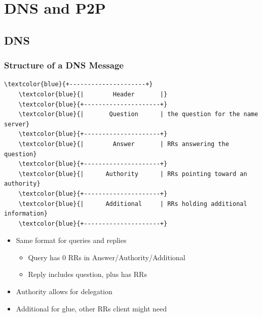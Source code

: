 \chapter{DNS and P2P}
\section{DNS}
\subsection{Structure of a DNS Message}
\begin{Verbatim}[commandchars=\\\{\}]
    \textcolor{blue}{+---------------------+}
    \textcolor{blue}{|        Header       |}
    \textcolor{blue}{+---------------------+}
    \textcolor{blue}{|       Question      | the question for the name server}
    \textcolor{blue}{+---------------------+}
    \textcolor{blue}{|        Answer       | RRs answering the question}
    \textcolor{blue}{+---------------------+}
    \textcolor{blue}{|      Authority      | RRs pointing toward an authority}
    \textcolor{blue}{+---------------------+}
    \textcolor{blue}{|      Additional     | RRs holding additional information}
    \textcolor{blue}{+---------------------+}
\end{Verbatim}
\begin{itemize}[nosep]
    \item Same format for queries and replies
          \begin{itemize}[nosep]
              \item Query has 0 RRs in Answer/Authority/Additional
              \item Reply includes question, plus has RRs
          \end{itemize}
    \item Authority allows for delegation
    \item Additional for glue, other RRs client might need
\end{itemize}
